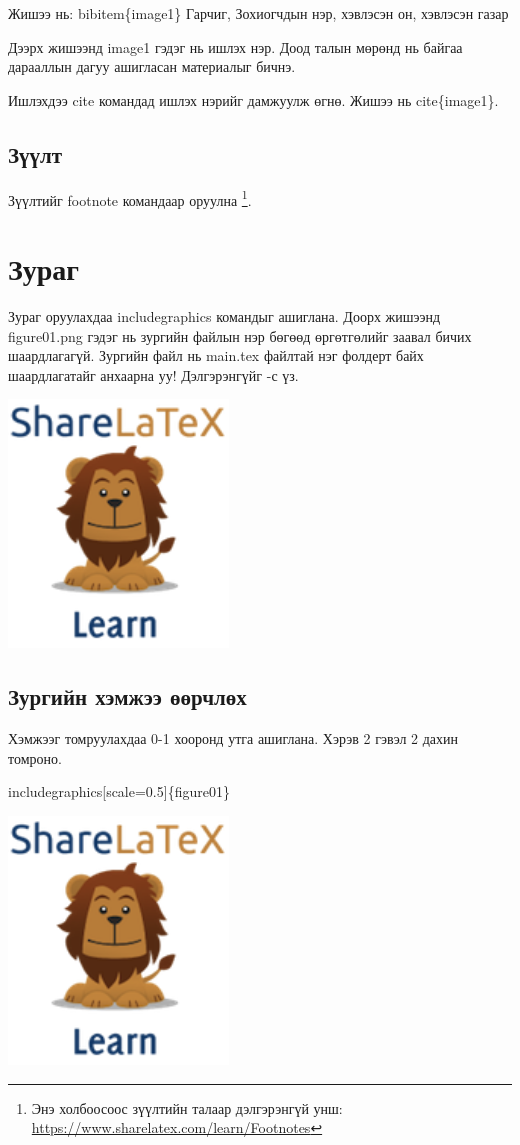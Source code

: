 \documentclass[12pt,A4]{report}
\begin{document}
Жишээ нь: bibitem\{image1\} Гарчиг, Зохиогчдын нэр, хэвлэсэн он, хэвлэсэн газар

Дээрх жишээнд image1 гэдэг нь ишлэх нэр. Доод талын мөрөнд нь байгаа дарааллын дагуу 
ашигласан материалыг бичнэ. 

Ишлэхдээ cite командад ишлэх нэрийг дамжуулж өгнө. Жишээ нь cite\{image1\}.
\section{Зүүлт}
Зүүлтийг footnote командаар оруулна \footnote{Энэ холбоосоос зүүлтийн талаар дэлгэрэнгүй унш: \url{https://www.sharelatex.com/learn/Footnotes}}. 

\chapter{Зураг}
Зураг оруулахдаа includegraphics командыг ашиглана. Доорх жишээнд figure01.png гэдэг нь зургийн файлын нэр бөгөөд өргөтгөлийг заавал бичих шаардлагагүй. Зургийн файл нь main.tex файлтай нэг фолдерт байх шаардлагатайг анхаарна уу! Дэлгэрэнгүйг \cite{image1}-с үз.

\includegraphics{figure01.png}


\section{Зургийн хэмжээ өөрчлөх}
Хэмжээг томруулахдаа 0-1 хооронд утга ашиглана. Хэрэв 2 гэвэл 2 дахин томроно. 
\begin{center}
includegraphics[scale=0.5]\{figure01\} 
\end{center}

\includegraphics[scale=0.9]{figure01}
\end{document}
